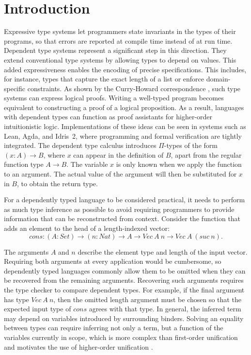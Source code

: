 
\section{\label{sec:introduction}Introduction}
Expressive type systems let programmers state invariants in the types of their programs, so that errors are reported at compile time instead of at run time.
Dependent type systems represent a significant step in this direction. They extend conventional type systems by allowing types to depend on values. This added expressiveness enables the encoding of precise specifications. This includes, for instance, types that capture the exact length of a list or enforce domain-specific constraints. As shown by the Curry-Howard correspondence \autocite{reis_curry-howard_nodate}, such type systems can express logical proofs. Writing a well-typed program becomes equivalent to constructing a proof of a logical proposition. As a result, languages with dependent types can function as proof assistants for higher-order intuitionistic logic. Implementations of these ideas can be seen in systems such as Lean, Agda, and Idris~2, where programming and formal verification are tightly integrated. The dependent type calculus introduces $\Pi$-types of the form $(x:A) \rightarrow B$, where $x$ can appear in the definition of $B$, apart from the regular function type $A \rightarrow B$. The variable $x$ is only known when we apply the function to an argument. The actual value of the argument will then be substituted for $x$ in $B$, to obtain the return type. 

For a dependently typed language to be considered practical, it needs to perform as much type inference as possible to avoid requiring
programmers to provide information that can be reconstructed from context.
Consider the function that adds an element to the head of a length-indexed
vector:
\[
    \mathit{cons} :
    (A : \mathit{Set}) \rightarrow
    (n : \mathit{Nat}) \rightarrow
    A \rightarrow
    \mathit{Vec}\ A\ n \rightarrow
    \mathit{Vec}\ A\ (\mathit{suc}\ n).
\]

The arguments $A$ and $n$ describe the element type and length of the input
vector. Requiring both arguments at every application would be cumbersome, so
dependently typed languages commonly allow them to be omitted when they can be
recovered from the remaining arguments. Recovering such arguments requires the type checker to compare dependent
types. For example, if the final argument has type $\mathit{Vec}\ A\ n$, then
the omitted length argument must be chosen so that the expected input type of
$\mathit{cons}$ agrees with that type. In general, the inferred term may depend on variables introduced by surrounding binders. Solving an equality between types can require inferring not only a term, but a function of the variables currently in scope, which is more complex than first-order unification and motivates the use of higher-order unification \autocite{mazzoli2016typechecking,miller_logic_1991}.

